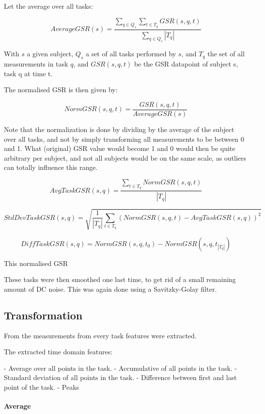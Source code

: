 \documentclass[12pt,leqno,letterpaper]{report} %
\begin{document}
Let the average over all tasks:


\[
AverageGSR(s) = \frac 
{\sum_{q \in Q_s}\sum_{t \in T_q} GSR(s,q,t)}
{ \sum_{q \in Q_s} \left\vert{T_q}\right\vert }
\]

With $s$ a given subject, $Q_s$ a set of all tasks performed by $s$, and $T_q$ the set of all measurements in task $q$, and $GSR(s,q,t)$ be the GSR datapoint of subject s, task q at time t.

The normalised GSR is then given by:

\[
NormGSR(s,q,t) = \frac{GSR(s,q,t)}{AverageGSR(s)}
\]

Note that the normalization is done by dividing by the average of the subject over all tasks, and not by simply transforming all measurements to be between 0 and 1. What (original) GSR value would become 1 and 0 would then be quite arbitrary per subject, and not all subjects would be on the same scale, as outliers can totally influence this range.






\[
AvgTaskGSR(s,q) = \frac { \sum_{t \in T_q} NormGSR(s,q,t) }
{\left\vert{T_q}\right\vert }
\]

\[
StdDevTaskGSR(s,q) = \sqrt {\frac{1}{\left\vert{T_q}\right\vert}   \sum_{t \in T_q} (NormGSR(s,q,t) - AvgTaskGSR(s,q))^2 }
\]

\[
DiffTaskGSR(s,q) = NormGSR(s,q, t_0) - NormGSR(s,q, t_{\left\vert{T_q}\right\vert})
\]

This normalised GSR 


These tasks were then smoothed one last time, to get rid of a small remaining amount of DC noise. This was again done using a Savitzky-Golay filter.

\subsection{Transformation}
From the measurements from every task features were extracted. 

The extracted time domain features:

- Average over all points in the task.
- Accumulative of all points in the task.
- Standard deviation of all points in the task.
- Difference between first and last point of the task.
- Peaks

\paragraph{Average}
\end{document}
